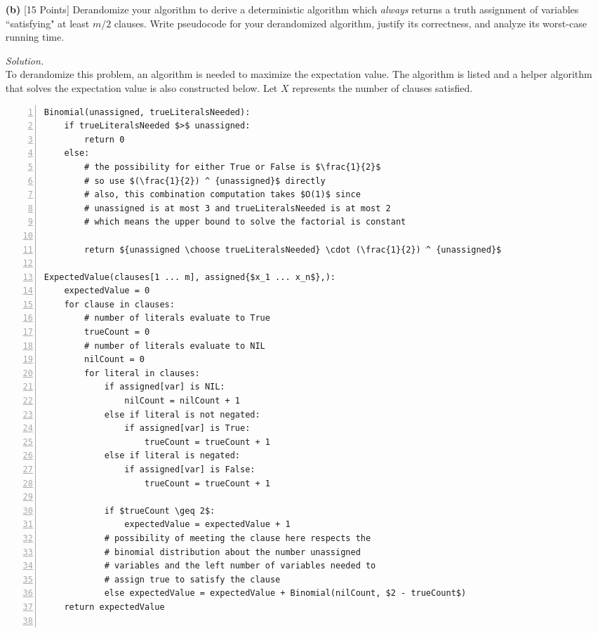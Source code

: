 \documentclass[10pt]{article}
\begin{document}
\begin{enumerate}
\begin{mdframed}
\begin{proof}
    \end{proof}
    \end{mdframed}
    \item[\textbf{(b)}] {[15 Points]} Derandomize your algorithm to derive a deterministic algorithm which \textit{always} returns a truth assignment of variables ``satisfying" at least $m/2$ clauses. Write pseudocode for your derandomized algorithm, justify its correctness, and analyze its worst-case running time.
    \begin{mdframed}
        \textit{Solution.}\\ %
        To derandomize this problem, an algorithm is needed to maximize the expectation value. The algorithm is listed and a helper algorithm that solves the expectation value is also constructed below. Let $X$ represents the number of clauses satisfied.
\begin{lstlisting}[mathescape=true, numbers=left]
Binomial(unassigned, trueLiteralsNeeded):
    if trueLiteralsNeeded $>$ unassigned:
        return 0
    else:
        # the possibility for either True or False is $\frac{1}{2}$
        # so use $(\frac{1}{2}) ^ {unassigned}$ directly
        # also, this combination computation takes $O(1)$ since
        # unassigned is at most 3 and trueLiteralsNeeded is at most 2
        # which means the upper bound to solve the factorial is constant
        
        return ${unassigned \choose trueLiteralsNeeded} \cdot (\frac{1}{2}) ^ {unassigned}$

ExpectedValue(clauses[1 ... m], assigned{$x_1 ... x_n$},):
    expectedValue = 0
    for clause in clauses:
        # number of literals evaluate to True
        trueCount = 0
        # number of literals evaluate to NIL
        nilCount = 0
        for literal in clauses:
            if assigned[var] is NIL:
                nilCount = nilCount + 1
            else if literal is not negated:
                if assigned[var] is True:
                    trueCount = trueCount + 1
            else if literal is negated:
                if assigned[var] is False:
                    trueCount = trueCount + 1
            
            if $trueCount \geq 2$:
                expectedValue = expectedValue + 1
            # possibility of meeting the clause here respects the
            # binomial distribution about the number unassigned
            # variables and the left number of variables needed to
            # assign true to satisfy the clause
            else expectedValue = expectedValue + Binomial(nilCount, $2 - trueCount$)
    return expectedValue


\end{lstlisting}
\end{mdframed}
\end{enumerate}
\end{document}

